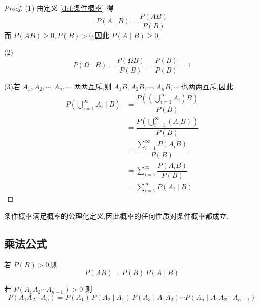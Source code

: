 \begin{proof}
    (1) 由定义 \ref{def:条件概率} 得
    $$P(A \mid B) = \dfrac{P(AB)}{P(B)}$$
    而 $P(AB) \geqslant 0, P(B)>0$,因此 $P(A \mid B) \geqslant 0$.

    (2)
    $$
    P(\varOmega \mid B) = \dfrac{P(\varOmega B)}{P(B)} = \dfrac{P(B)}{P(B)} = 1
    $$

    (3)若 $A_1, A_2, \cdots, A_n, \cdots$ 两两互斥,则 $A_1 B, A_2 B, \cdots, A_n B, \cdots$ 也两两互斥,因此
    $$
    \begin{aligned}
        P \left( \bigcup_{i=1}^{\infty} A_i \mid B \right) &= \dfrac{P \left( \left( \displaystyle\bigcup_{i=1}^{\infty} A_i \right) B \right)}{P(B)} \\
        &= \dfrac{P \left( \displaystyle\bigcup_{i=1}^{\infty} (A_i B) \right)}{P(B)} \\
        &= \dfrac{\displaystyle\sum_{i=1}^{\infty} P(A_i B)}{P(B)} \\
        &= \sum_{i=1}^{\infty} \dfrac{P(A_i B)}{P(B)} \\
        &= \sum_{i=1}^{\infty} P(A_i \mid B)
    \end{aligned}
    $$

    \vspace{-2em}
\end{proof}

\begin{note}
    \indent 条件概率满足概率的公理化定义,因此概率的任何性质对条件概率都成立.
\end{note}

\subsection{乘法公式}

\begin{theorem}[][乘法公式]
    \indent 若 $P(B)>0$,则
    \begin{equation} \label{equation:乘法公式}
        P(AB) = P(B) \, P(A \mid B)    
    \end{equation}
    
    若 $P(A_1 A_2 \cdots A_{n-1}) > 0$ 则
    \begin{equation} \label{equation:一般的乘法公式}
        P(A_1 A_2 \cdots A_n) = P(A_1) \, P(A_2 \mid A_1) \, P(A_3 \mid A_1 A_2) \cdots P(A_n \mid A_1 A_2 \cdots A_{n-1})
    \end{equation}
\end{theorem}

